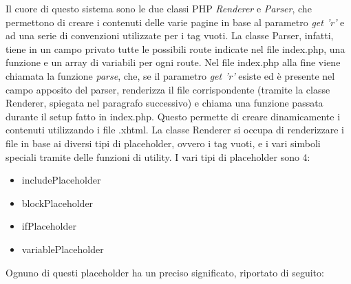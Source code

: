 Il cuore di questo sistema sono le due classi PHP \textit{Renderer} e \textit{Parser}, che permettono di creare i contenuti delle varie pagine in base al parametro \textit{get 'r'} e ad una serie di convenzioni utilizzate per i tag vuoti. La classe Parser, infatti,
tiene in un campo privato tutte le possibili route indicate nel file index.php, una funzione e un array di variabili per ogni route. Nel file index.php alla fine viene chiamata la funzione \textit{parse}, che, se il parametro \textit{get 'r'} esiste ed è presente nel campo apposito 
del parser, renderizza il file corrispondente (tramite la classe Renderer, spiegata nel paragrafo successivo) e chiama una funzione passata durante il setup fatto in index.php. Questo permette di creare dinamicamente i contenuti utilizzando i file .xhtml.
La classe Renderer si occupa di renderizzare i file in base ai diversi tipi di placeholder, ovvero i tag vuoti, e i vari simboli speciali tramite delle funzioni di utility. 
I vari tipi di placeholder sono 4:

\begin{itemize}
    
	\item includePlaceholder
    \item blockPlaceholder
	\item ifPlaceholder
	\item variablePlaceholder
	
\end{itemize}

Ognuno di questi placeholder ha un preciso significato, riportato di seguito:

